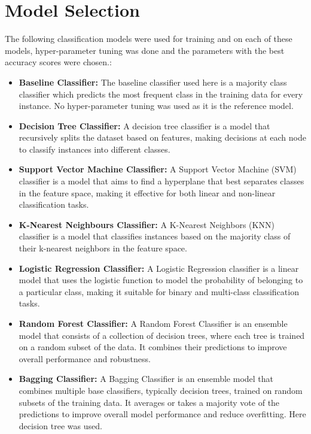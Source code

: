 \documentclass{article}
\begin{document}
\section{Model Selection}

The following classification models were used for training and on each of these models, hyper-parameter tuning was done and the parameters with the best accuracy scores were chosen.:

\begin{itemize}
    \item \textbf{Baseline Classifier:} The baseline classifier used here is a majority class classifier which predicts the most frequent class in the training data for every instance. No hyper-parameter tuning was used as it is the reference model.
    
    \item \textbf{Decision Tree Classifier:} A decision tree classifier is a model that recursively splits the dataset based on features, making decisions at each node to classify instances into different classes.

    \item \textbf{Support Vector Machine Classifier:} A Support Vector Machine (SVM) classifier is a model that aims to find a hyperplane that best separates classes in the feature space, making it effective for both linear and non-linear classification tasks.

    \item \textbf{K-Nearest Neighbours Classifier:} A K-Nearest Neighbors (KNN) classifier is a model that classifies instances based on the majority class of their k-nearest neighbors in the feature space.

    \item \textbf{Logistic Regression Classifier:} A Logistic Regression classifier is a linear model that uses the logistic function to model the probability of belonging to a particular class, making it suitable for binary and multi-class classification tasks.

    \item \textbf{Random Forest Classifier:} A Random Forest Classifier is an ensemble model that consists of a collection of decision trees, where each tree is trained on a random subset of the data. It combines their predictions to improve overall performance and robustness.

    \item \textbf{Bagging Classifier:} A Bagging Classifier is an ensemble model that combines multiple base classifiers, typically decision trees, trained on random subsets of the training data. It averages or takes a majority vote of the predictions to improve overall model performance and reduce overfitting. Here decision tree was used.


\end{itemize}
\end{document}

